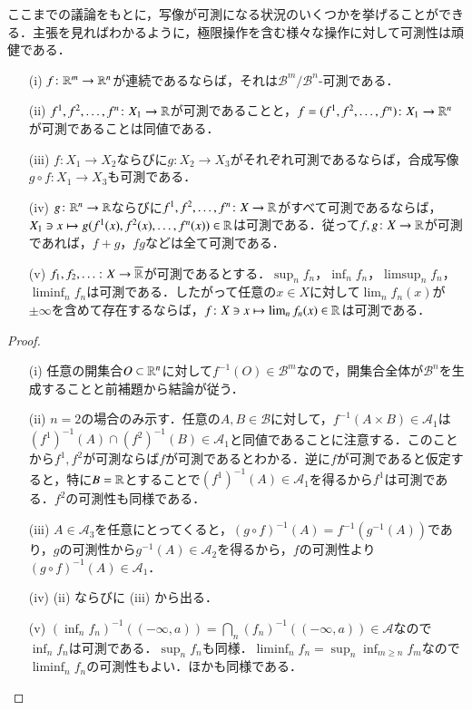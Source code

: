 ここまでの議論をもとに，写像が可測になる状況のいくつかを挙げることができる．主張を見ればわかるように，極限操作を含む様々な操作に対して可測性は頑健である．

\begin{prop}
\leavevmode
\begin{enumerate}
\item[(i)] $f \colon \mathbb{R}^m \to \mathbb{R}^n$が連続であるならば，それは$\mathcal{B}^m/\mathcal{B}^n$-可測である．
\item[(ii)] $f^1, f^2, \dots, f^n \colon X_1 \to \mathbb{R}$が可測であることと，$f = (f^1, f^2, \dots, f^n) \colon X_1 \to \mathbb{R}^n$が可測であることは同値である．
\item[(iii)] $f \colon X_1 \to X_2$ならびに$g \colon X_2 \to X_3$がそれぞれ可測であるならば，合成写像$g \circ f \colon X_1 \to X_3$も可測である．
\item[(iv)] $g \colon \mathbb{R}^n \to \mathbb{R}$ならびに$f^1, f^2, \dots, f^n \colon X \to \mathbb{R}$がすべて可測であるならば，$X_1 \ni x \mapsto g(f^1(x), f^2(x), \dots, f^n(x)) \in \mathbb{R}$は可測である．従って$f,g \colon X \to \mathbb{R}$が可測であれば，$f+g$，$fg$などは全て可測である．
\item[(v)] $f_1, f_2, \dots \colon X \to \overline{\mathbb{R}}$が可測であるとする．$\sup_n f_n$，$\inf_n f_n$，$\limsup_n f_n$，$\liminf_n f_n$は可測である．したがって任意の$x \in X$に対して$\lim_n f_n(x)$が$\pm \infty$を含めて存在するならば，$f \colon X \ni x \mapsto \lim_n f_n(x) \in \mathbb{R}$は可測である．
\end{enumerate}
\end{prop}

\begin{proof}
\leavevmode
\begin{enumerate}
\item[(i)] 任意の開集合$O \subset \mathbb{R}^n$に対して$f^{-1}(O) \in \mathcal{B}^m$なので，開集合全体が$\mathcal{B}^n$を生成することと前補題から結論が従う．
\item[(ii)] $n=2$の場合のみ示す．任意の$A,B \in \mathcal{B}$に対して，$f^{-1}(A \times B) \in \mathcal{A}_1$は$\left(f^1\right)^{-1}(A) \cap \left(f^2\right)^{-1}(B) \in \mathcal{A}_1$と同値であることに注意する．このことから$f^1,f^2$が可測ならば$f$が可測であるとわかる．逆に$f$が可測であると仮定すると，特に$B=\mathbb{R}$とすることで$\left(f^1\right)^{-1}(A) \in \mathcal{A}_1$を得るから$f^1$は可測である．$f^2$の可測性も同様である．
\item[(iii)] $A \in \mathcal{A}_3$を任意にとってくると，$(g\circ f)^{-1}(A) = f^{-1}(g^{-1}(A))$であり，$g$の可測性から$g^{-1}(A) \in \mathcal{A}_2$を得るから，$f$の可測性より$(g\circ f)^{-1}(A) \in \mathcal{A}_1$．
\item[(iv)] (ii) ならびに (iii) から出る．
\item[(v)] $(\inf_n f_n)^{-1}((-\infty, a)) = \bigcap_n (f_n)^{-1} ((-\infty, a)) \in \mathcal{A}$なので$\inf_n f_n$は可測である．$\sup_n f_n$も同様．$\liminf_n f_n = \sup_n \inf_{m \geq n} f_m$なので$\liminf_n f_n$の可測性もよい．ほかも同様である．
\end{enumerate}
\end{proof}

